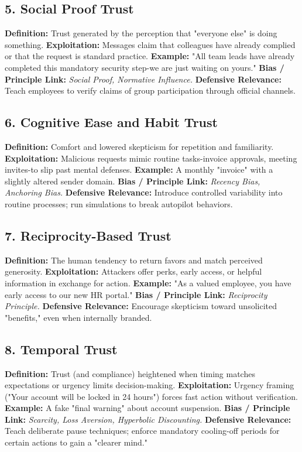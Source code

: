 {\subsection{5. Social Proof Trust}
\textbf{Definition:} Trust generated by the perception that "everyone else" is doing something.
\textbf{Exploitation:} Messages claim that colleagues have already complied or that the request is standard practice.
\textbf{Example:} "All team leads have already completed this mandatory security step-we are just waiting on yours."
\textbf{Bias / Principle Link: }\textit{Social Proof, Normative Influence.}
\textbf{Defensive Relevance:} Teach employees to verify claims of group participation through official channels.

\subsection{6. Cognitive Ease and Habit Trust}
\textbf{Definition:} Comfort and lowered skepticism for repetition and familiarity.
\textbf{Exploitation:} Malicious requests mimic routine tasks-invoice approvals, meeting invites-to slip past mental defenses.
\textbf{Example:} A monthly "invoice" with a slightly altered sender domain.
\textbf{Bias / Principle Link:} \textit{Recency Bias, Anchoring Bias.}
\textbf{Defensive Relevance:} Introduce controlled variability into routine processes; run simulations to break autopilot behaviors.

\subsection{7. Reciprocity-Based Trust}
\textbf{Definition:} The human tendency to return favors and match perceived generosity.
\textbf{Exploitation:} Attackers offer perks, early access, or helpful information in exchange for action.
\textbf{Example:} "As a valued employee, you have early access to our new HR portal."
\textbf{Bias / Principle Link:} \textit{Reciprocity Principle.}
\textbf{Defensive Relevance:} Encourage skepticism toward unsolicited "benefits," even when internally branded.

\subsection{8. Temporal Trust}
\textbf{Definition:} Trust (and compliance) heightened when timing matches expectations or urgency limits decision-making.
\textbf{Exploitation:} Urgency framing ("Your account will be locked in 24 hours") forces fast action without verification.
\textbf{Example:} A fake "final warning" about account suspension.
\textbf{Bias / Principle Link:} \textit{Scarcity, Loss Aversion, Hyperbolic Discounting.}
\textbf{Defensive Relevance:} Teach deliberate pause techniques; enforce mandatory cooling-off periods for certain actions to gain a "clearer mind."

}

